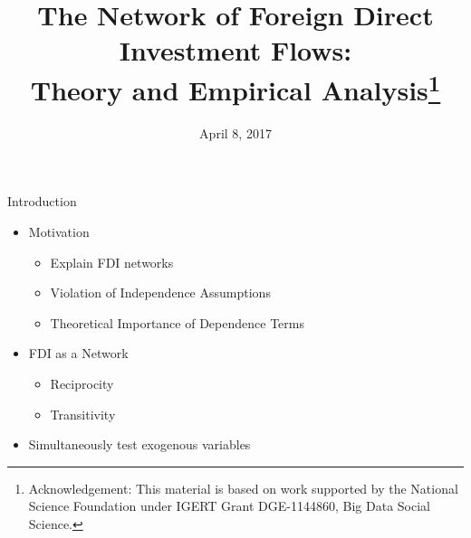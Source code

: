 \documentclass{beamer}
\title[The Network of FDI Flows]{The Network of Foreign Direct Investment Flows:\\Theory and Empirical Analysis\thanks{\scriptsize {Acknowledgement: This material is based on work supported by the National Science Foundation under IGERT Grant DGE-1144860, Big Data Social Science.}}}
\author[Schoeneman, Zhu, \& Desmarais]{%
  \texorpdfstring{%
    \begin{columns}
      \column{.3\linewidth}
      \centering
      John Schoeneman{\thanks{\scriptsize{Pennsylvania State University}}} \\ \scriptsize{jbs5686@psu.edu\\ PhD Candidate}
      \column{.3\linewidth}
      \centering
      Boliang Zhu{\samethanks[2]} \\ \scriptsize{bxz14@psu.edu\\ Assistant Professor}
    \end{columns}
    \vspace{12pt}
    \begin{columns}
      \column{.3\linewidth}
      \centering
      Bruce Desmarais{\samethanks[2]}\\ \scriptsize{bdesmarais@psu.edu\\ Associate Professor}
    \end{columns}
 }
 {Author 1, Author 2, Author 3}
}
\date{April 8, 2017}
\begin{document}
\begin{frame}
  \titlepage


\end{frame}




\begin{frame}{Introduction}


\begin{itemize}
 \item{Motivation}
 \begin{itemize}
 \item{Explain FDI networks}
\item{Violation of Independence Assumptions}
\item{Theoretical Importance of Dependence Terms}
 \end{itemize}
\item{FDI as a Network}
\begin{itemize}
\item{Reciprocity}
\item{Transitivity}
 \end{itemize}

  \item{Simultaneously test exogenous variables}
 \end{itemize}



\end{frame}
\end{document}
